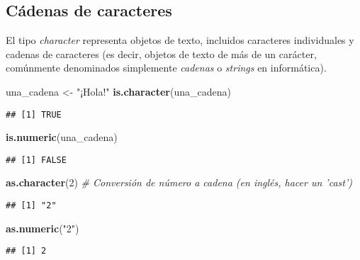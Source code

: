 \documentclass[
]{book}
\newenvironment{Shaded}{\begin{snugshade}}{\end{snugshade}}
\newcommand{\CommentTok}[1]{\textcolor[rgb]{0.56,0.35,0.01}{\textit{#1}}}
\newcommand{\DecValTok}[1]{\textcolor[rgb]{0.00,0.00,0.81}{#1}}
\newcommand{\KeywordTok}[1]{\textcolor[rgb]{0.13,0.29,0.53}{\textbf{#1}}}
\newcommand{\NormalTok}[1]{#1}
\newcommand{\StringTok}[1]{\textcolor[rgb]{0.31,0.60,0.02}{#1}}
\begin{document}
\hypertarget{cuxe1denas-de-caracteres}{%
\subsection{Cádenas de caracteres}\label{cuxe1denas-de-caracteres}}

El tipo \emph{character} representa objetos de texto, incluidos caracteres individuales y cadenas de caracteres (es decir, objetos de texto de más de un carácter, comúnmente denominados simplemente \emph{cadenas} o \emph{strings} en informática).

\begin{Shaded}
\begin{Highlighting}[]
\NormalTok{una_cadena <-}\StringTok{ "¡Hola!"}
\KeywordTok{is.character}\NormalTok{(una_cadena)}
\end{Highlighting}
\end{Shaded}

\begin{verbatim}
## [1] TRUE
\end{verbatim}

\begin{Shaded}
\begin{Highlighting}[]
\KeywordTok{is.numeric}\NormalTok{(una_cadena)}
\end{Highlighting}
\end{Shaded}

\begin{verbatim}
## [1] FALSE
\end{verbatim}

\begin{Shaded}
\begin{Highlighting}[]
\KeywordTok{as.character}\NormalTok{(}\DecValTok{2}\NormalTok{) }\CommentTok{# Conversión de número a cadena (en inglés, hacer un 'cast')}
\end{Highlighting}
\end{Shaded}

\begin{verbatim}
## [1] "2"
\end{verbatim}

\begin{Shaded}
\begin{Highlighting}[]
\KeywordTok{as.numeric}\NormalTok{(}\StringTok{"2"}\NormalTok{)}
\end{Highlighting}
\end{Shaded}

\begin{verbatim}
## [1] 2
\end{verbatim}
\end{document}
